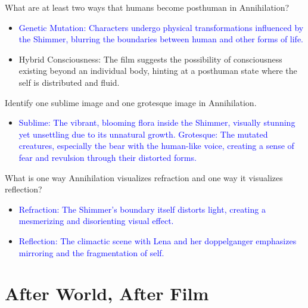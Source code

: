 \documentclass[11pt,fleqn]{book} %
\begin{document}
\begin{exercise}
What are at least two ways that humans become posthuman in Annihilation?
\begin{itemize}
\item \textcolor{blue}{Genetic Mutation: Characters undergo physical transformations influenced by the Shimmer, blurring the boundaries between human and other forms of life.}
\item Hybrid Consciousness: The film suggests the possibility of consciousness existing beyond an individual body, hinting at a posthuman state where the self is distributed and fluid. 
\end{itemize}
\end{exercise}

\begin{exercise}
Identify one sublime image and one grotesque image in Annihilation.
\begin{itemize}
\item \textcolor{blue}{Sublime: The vibrant, blooming flora inside the Shimmer, visually stunning yet unsettling due to its unnatural growth.}
\textcolor{blue}{Grotesque: The mutated creatures, especially the bear with the human-like voice, creating a sense of fear and revulsion through their distorted forms.}
\end{itemize}
\end{exercise}

\begin{exercise}
What is one way Annihilation visualizes refraction and one way it visualizes reflection?
\begin{itemize}
\item \textcolor{blue}{Refraction: The Shimmer's boundary itself distorts light, creating a mesmerizing and disorienting visual effect.}
\item \textcolor{blue}{Reflection:  The climactic scene with Lena and her doppelganger emphasizes mirroring and the fragmentation of self.}
\end{itemize}
\end{exercise}




\section{After World, After Film}
\end{document}
